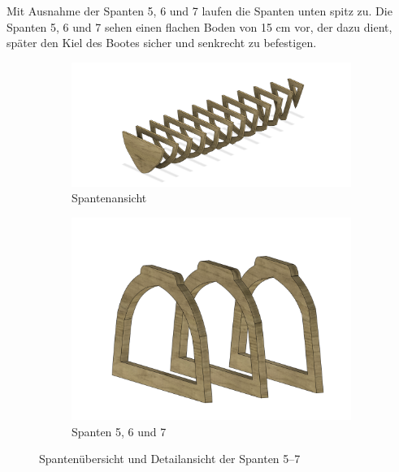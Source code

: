 Mit Ausnahme der Spanten 5, 6 und 7 laufen die Spanten unten spitz zu. Die Spanten 5, 6 und 7 sehen einen flachen Boden von 15 cm vor, der dazu dient, später den Kiel des Bootes sicher und senkrecht zu befestigen.
\begin{figure}[H]
    \centering
    \begin{subfigure}[b]{0.6\linewidth}
        \centering
        \includegraphics[width=\linewidth]{assets/rippen_cad.png}
        \caption{Spantenansicht}
        \label{fig:Spantenansicht}
    \end{subfigure}
    \hfill
    \begin{subfigure}[b]{0.38\linewidth}
        \centering
        \includegraphics[width=\linewidth]{assets/spanent_upside_down.png}
        \caption{Spanten 5, 6 und 7}
        \label{fig:SpantenDetail}
    \end{subfigure}
    \caption{Spantenübersicht und Detailansicht der Spanten 5–7}
    \label{fig:SpantenUebersicht}
\end{figure}



